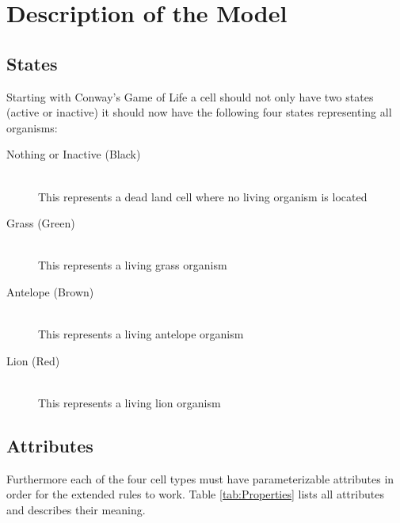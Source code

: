 \documentclass[11pt]{article}
\begin{document}
\section{Description of the Model}
\subsection{States}
Starting with Conway's Game of Life \cite{gameOfLife} a cell should not only have two states (active or inactive) it should now have the following four states representing all organisms:

\begin{description}
  \item[Nothing or Inactive (Black)] \hfill \\
	This represents a dead land cell where no living organism is located
  \item[Grass (Green)] \hfill \\
	This represents a living grass organism
  \item[Antelope (Brown)]  \hfill \\
	This represents a living antelope organism
  \item[Lion (Red)] 
   \hfill \\This represents a living lion organism
\end{description}

\subsection{Attributes}
Furthermore each of the four cell types must have parameterizable attributes in order for the extended rules to work. 
Table \ref{tab:Properties} lists all attributes and describes their meaning.
\end{document}
